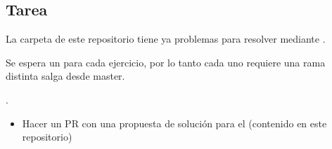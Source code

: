 \documentclass[a4paper,12pt,spanish]{sphinxmanual}
\begin{document}
\subsection{Tarea}
\label{\detokenize{mi-primer-pr:tarea}}
\sphinxAtStartPar
La carpeta 
de este repositorio tiene ya problemas para resolver mediante .

\sphinxAtStartPar
Se espera un  para cada ejercicio, por lo tanto cada uno requiere una
rama distinta  salga desde master.

\sphinxAtStartPar
{}.
\begin{itemize}
\item {} 
\sphinxAtStartPar
Hacer un PR con una propuesta de solución para el
(contenido en este repositorio)

\end{itemize}
\end{document}
